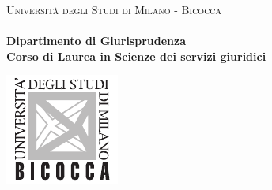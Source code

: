 \documentclass[12pt,it,a4paper,]{report}
\begin{document}
    \begin{titlepage}
        
        

        
        \noindent

	\vspace{1mm}
	\begin{center}
            {
              {\textsc{Università degli Studi di Milano - Bicocca}} \\
              \textbf{} \\
              \textbf{Dipartimento di Giurisprudenza} \\
              \textbf{Corso di Laurea in Scienze dei servizi
giuridici} \\
              \par
            }
        \end{center}
        
	\vspace{4mm}
        
	\begin{center}
          \begin{minipage}[t]{0.19\textwidth}{
              \vspace{-4mm}
              {\includegraphics[scale=1.5]{style/univ_logo.pdf}}
            }
          \end{minipage}
        \end{center}


\end{titlepage}
\end{document}

